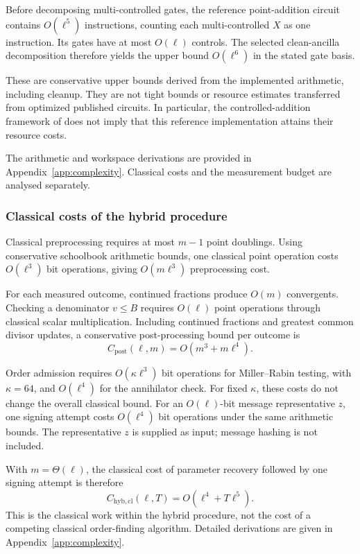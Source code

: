 \begin{revision}
\begin{remark}
\label{rem:table_cost}
Before decomposing multi-controlled gates, the reference point-addition circuit contains $O(\ell^5)$ instructions, counting each multi-controlled $X$ as one instruction. Its gates have at most $O(\ell)$ controls. The selected clean-ancilla decomposition therefore yields the upper bound $O(\ell^6)$ in the stated gate basis.

These are conservative upper bounds derived from the implemented arithmetic, including cleanup. They are not tight bounds or resource estimates transferred from optimized published circuits. In particular, the controlled-addition framework of \cite{ProosZalka2003,Roetteler2017} does not imply that this reference implementation attains their resource costs.
\end{remark}

The arithmetic and workspace derivations are provided in Appendix~\ref{app:complexity}. Classical costs and the measurement budget are analysed separately.

\subsubsection{Classical costs of the hybrid procedure}

Classical preprocessing requires at most $m-1$ point doublings. Using conservative schoolbook arithmetic bounds, one classical point operation costs $O(\ell^3)$ bit operations, giving $O(m\ell^3)$ preprocessing cost.

For each measured outcome, continued fractions produce $O(m)$ convergents. Checking a denominator $v\leq B$ requires $O(\ell)$ point operations through classical scalar multiplication. Including continued fractions and greatest common divisor updates, a conservative post-processing bound per outcome is
\[
C_{\mathrm{post}}(\ell,m)
=O(m^3+m\ell^4).
\]

Order admission requires $O(\kappa\ell^3)$ bit operations for Miller--Rabin testing, with $\kappa=64$, and $O(\ell^4)$ for the annihilator check. For fixed $\kappa$, these costs do not change the overall classical bound. For an $O(\ell)$-bit message representative $z$, one signing attempt costs $O(\ell^4)$ bit operations under the same arithmetic bounds. The representative $z$ is supplied as input; message hashing is not included. 

With $m=\Theta(\ell)$, the classical cost of parameter recovery followed by one signing
attempt is therefore
\begin{equation}
    \label{eq:hybrid_classical_cost}
    C_{\mathrm{hyb,cl}}(\ell,T)
    =O(\ell^4+T\ell^5).
\end{equation}
This is the classical work within the hybrid procedure, not the cost of a competing classical order-finding algorithm. Detailed derivations are given in Appendix~\ref{app:complexity}.
\end{revision}

